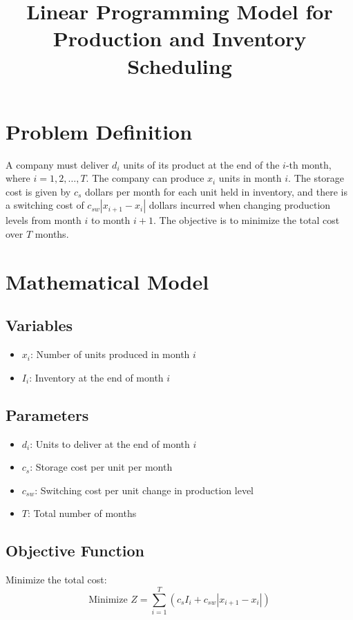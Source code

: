 \documentclass{article}
\begin{document}
\title{Linear Programming Model for Production and Inventory Scheduling}
\author{}
\date{}
\maketitle

\section*{Problem Definition}

A company must deliver \( d_i \) units of its product at the end of the \( i \)-th month, where \( i = 1, 2, \ldots, T \). The company can produce \( x_i \) units in month \( i \). The storage cost is given by \( c_s \) dollars per month for each unit held in inventory, and there is a switching cost of \( c_{sw} |x_{i+1} - x_i| \) dollars incurred when changing production levels from month \( i \) to month \( i+1 \). The objective is to minimize the total cost over \( T \) months.

\section*{Mathematical Model}

\subsection*{Variables}
\begin{itemize}
    \item \( x_i \): Number of units produced in month \( i \)
    \item \( I_i \): Inventory at the end of month \( i \)
\end{itemize}

\subsection*{Parameters}
\begin{itemize}
    \item \( d_i \): Units to deliver at the end of month \( i \)
    \item \( c_s \): Storage cost per unit per month
    \item \( c_{sw} \): Switching cost per unit change in production level
    \item \( T \): Total number of months
\end{itemize}

\subsection*{Objective Function}
Minimize the total cost:
\[
\text{Minimize } Z = \sum_{i=1}^T \left( c_s I_i + c_{sw} |x_{i+1} - x_i| \right)
\]
\end{document}
